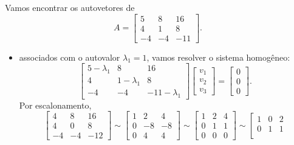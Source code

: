 \begin{ex}
	Vamos encontrar os autovetores de
	\begin{equation}
	A =
	\left[
	\begin{array}{ccc}
	5 & 8 & 16 \\
	4 & 1 & 8 \\
	-4 & -4 & -11
	\end{array}
	\right].
	\end{equation}

	\begin{itemize}
		\item associados com o autovalor $\lambda_1 = 1$, vamos resolver o sistema homogêneo:
		\begin{equation}
		\left[
		\begin{array}{ccc}
		5-\lambda_1 & 8 & 16 \\
		4 & 1-\lambda_1 & 8 \\
		-4 & -4 & -11-\lambda_1
		\end{array}
		\right] \left[
		\begin{array}{ccc}
		v_1 \\
		v_2 \\
		v_3
		\end{array}
		\right] = \left[
		\begin{array}{ccc}
		0 \\
		0 \\
		0
		\end{array}
		\right].
		\end{equation} Por escalonamento,
		\begin{equation}
		\left[
		\begin{array}{ccc}
		4 &  8 & 16 \\
		4 &  0 & 8 \\
		-4 & -4 & -12
		\end{array}
		\right] \sim \left[
		\begin{array}{ccc}
		1 &  2 & 4 \\
		0 & -8 & -8 \\
		0 &  4 & 4
		\end{array}
		\right] \sim \left[
		\begin{array}{ccc}
		1 &  2 & 4 \\
		0 &  1 & 1 \\
		0 &  0 & 0
		\end{array}
		\right] \sim \left[
		\begin{array}{ccc}
		1 &  0 & 2 \\
		0 &  1 & 1 \\

\end{array}
\end{equation}
\end{itemize}
\end{ex}
